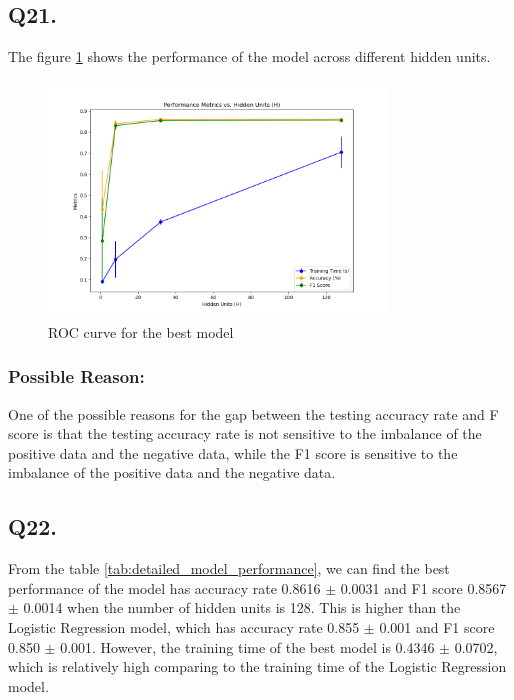 \documentclass{article}
\begin{document}
\subsection*{Q21.}

The figure \ref{fig:Performance_vs_H} shows the performance of the model across different hidden units.
\begin{figure}[h!]
    \centering
    \includegraphics[width=0.8\textwidth]{./pic/Combined_Performance_vs_H.png}
    \caption{ROC curve for the best model}
    \label{fig:Performance_vs_H}
\end{figure}

\subsubsection*{Possible Reason:}

One of the possible reasons for the gap between the testing accuracy rate and F score is that the testing accuracy rate is not sensitive to the imbalance of the positive data and the negative data, while the F1 score is sensitive to the imbalance of the positive data and the negative data.

\subsection*{Q22.}

From the table \ref{tab:detailed_model_performance}, we can find the best performance of the model has accuracy rate 0.8616 $\pm$ 0.0031 and F1 score 0.8567 $\pm$ 0.0014 when the number of hidden units is 128. This is higher than the Logistic Regression model, which has accuracy rate 0.855 $\pm$ 0.001 and F1 score 0.850 $\pm$ 0.001.
However, the training time of the best model is 0.4346 $\pm$ 0.0702, which is relatively high comparing to the training time of the Logistic Regression model.
\end{document}
